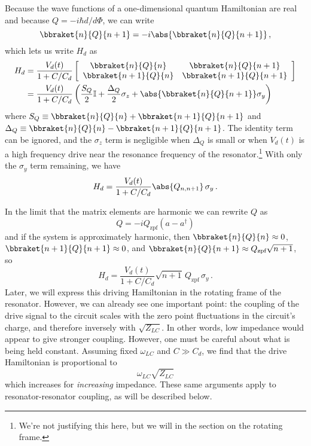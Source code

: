 Because the wave functions of a one-dimensional quantum Hamiltonian are real and because $Q = -i \hbar d/d\Phi$, we can write
\begin{equation*}
  \bbraket{n}{Q}{n+1} = -i \abs{\bbraket{n}{Q}{n+1}} \, ,
\end{equation*}
which lets us write $H_d$ as
\begin{align*}
  H_d
  &= \frac{V_d(t)}{1 + C / C_d}
    \left[ \begin{array}{cc}
      \bbraket{n}{Q}{n} & \bbraket{n}{Q}{n+1} \\
      \bbraket{n+1}{Q}{n} & \bbraket{n+1}{Q}{n+1}
    \end{array}\right] \\
  &= \frac{V_d(t)}{1 + C / C_d} \left(
      \frac{S_Q}{2} \mathbb{I}
    + \frac{\Delta_Q}{2} \sigma_z
    + \abs{\bbraket{n}{Q}{n+1}} \sigma_y
  \right)
\end{align*}
where $S_Q \equiv \bbraket{n}{Q}{n} + \bbraket{n+1}{Q}{n+1}$ and $\Delta_Q \equiv \bbraket{n}{Q}{n} - \bbraket{n+1}{Q}{n+1}$.
The identity term can be ignored, and the $\sigma_z$ term is negligible when $\Delta_Q$ is small or when $V_d(t)$ is a high frequency drive near the resonance frequency of the resonator.\footnote{We're not justifying this here, but we will in the section on the rotating frame.}
With only the $\sigma_y$ term remaining, we have
\begin{equation}
  H_d = \frac{V_d(t)}{1 + C/C_d} \abs{Q_{n,n+1}} \, \sigma_y \, .
\end{equation}

In the limit that the matrix elements are harmonic we can rewrite $Q$ as
\begin{equation*}
  Q = -i Q_\text{zpf} (a - a^\dagger)
\end{equation*}
and if the system is approximately harmonic, then $\bbraket{n}{Q}{n} \approx 0$, $\bbraket{n+1}{Q}{n+1} \approx 0$, and $\bbraket{n}{Q}{n+1} \approx Q_\text{zpf} \sqrt{n+1}$, so
\begin{equation*}
  H_d = \frac{V_d(t)}{1 + C / C_d} \sqrt{n+1} \, Q_\text{zpf} \, \sigma_y
  \, .
\end{equation*}
Later, we will express this driving Hamiltonian in the rotating frame of the resonator.
However, we can already see one important point: the coupling of the drive signal to the circuit scales with the zero point fluctuations in the circuit's charge, and therefore inversely with $\sqrt{Z_{LC}}$.
In other words, low impedance would appear to give stronger coupling.
However, one must be careful about what is being held constant.
Assuming fixed $\omega_{LC}$ and $C \gg C_d$, we find that the drive Hamiltonian is proportional to
\begin{equation}
  \omega_{LC} \sqrt{Z_{LC}}
\end{equation}
which increases for \emph{increasing} impedance.
These same arguments apply to resonator-resonator coupling, as will be described below.

